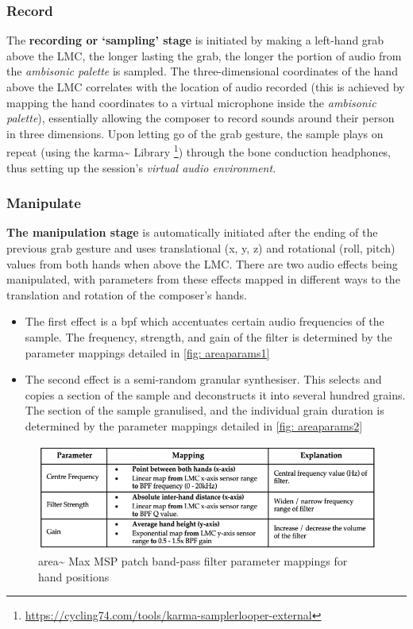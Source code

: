 \subsubsection{Record}\label{sec: area-system-software-record}
The \textbf{recording or `sampling' stage} is initiated by making a left-hand grab above the LMC, the longer lasting the grab, the longer the portion of audio from the \textit{ambisonic palette} is sampled. The three-dimensional coordinates of the hand above the LMC correlates with the location of audio recorded (this is achieved by mapping the hand coordinates to a virtual microphone inside the \textit{ambisonic palette}), essentially allowing the composer to record sounds around their person in three dimensions. Upon letting go of the grab gesture, the sample plays on repeat (using the karma\textasciitilde{} Library \footnote{\url{https://cycling74.com/tools/karma-samplerlooper-external}}) through the bone conduction headphones, thus setting up the session's \textit{virtual audio environment}.

\subsubsection{Manipulate}\label{sec: area-system-software-manip}
\textbf{The manipulation stage} is automatically initiated after the ending of the previous grab gesture and uses translational (x, y, z) and rotational (roll, pitch) values from both hands when above the LMC. There are two audio effects being manipulated, with parameters from these effects mapped in different ways to the translation and rotation of the composer's hands.
\begin{itemize}
    \item The first effect is a \gls{bpf} which accentuates certain audio frequencies of the sample. The frequency, strength, and gain of the filter is determined by the parameter mappings detailed in \autoref{fig: areaparams1}
    \item The second effect is a semi-random granular synthesiser. This selects and copies a section of the sample and deconstructs it into several hundred grains. The section of the sample granulised, and the individual grain duration is determined by the parameter mappings detailed in \autoref{fig: areaparams2} 
\end{itemize}
\begin{figure}
    \centering
    \includegraphics[width=1\linewidth]{figures/05-area/areatechnical_param1.png}
    \caption{area\textasciitilde{} Max MSP patch band-pass filter parameter mappings for hand positions}
    \label{fig: areaparams1}
\end{figure}

